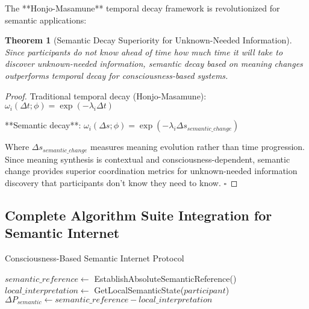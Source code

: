 \documentclass[12pt,a4paper]{article}
\newtheorem{theorem}{Theorem}[section]
\begin{document}
\begin{algorithm}
\begin{algorithmic}[1]
The **Honjo-Masamune** temporal decay framework is revolutionized for semantic applications:

\begin{theorem}[Semantic Decay Superiority for Unknown-Needed Information]
Since participants do not know ahead of time how much time it will take to discover unknown-needed information, semantic decay based on meaning changes outperforms temporal decay for consciousness-based systems.
\end{theorem}

\begin{proof}
Traditional temporal decay (Honjo-Masamune): $\omega_i(\Delta t; \phi) = \exp(-\lambda_i \Delta t)$

**Semantic decay**: $\omega_i(\Delta s; \phi) = \exp(-\lambda_i \Delta s_{semantic\_change})$

Where $\Delta s_{semantic\_change}$ measures meaning evolution rather than time progression. Since meaning synthesis is contextual and consciousness-dependent, semantic change provides superior coordination metrics for unknown-needed information discovery that participants don't know they need to know. $\square$
\end{proof}

\subsection{Complete Algorithm Suite Integration for Semantic Internet}

\begin{algorithm}
\caption{Consciousness-Based Semantic Internet Protocol}
\begin{algorithmic}[1]
    \State $semantic\_reference \leftarrow$ EstablishAbsoluteSemanticReference()
        \State $local\_interpretation \leftarrow$ GetLocalSemanticState($participant$)
        \State $\Delta P_{semantic} \leftarrow semantic\_reference - local\_interpretation$
        
            \State {}
            \State {}
            \State {}
            \State {}
            \State {}
        \EndIf
    \EndFor
    

\end{algorithmic}
\end{algorithm}
\end{algorithmic}
\end{algorithm}
\end{document}
